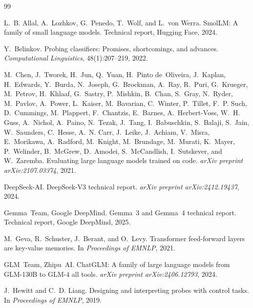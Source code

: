 \documentclass[11pt,a4paper]{article}
\begin{document}
\begin{thebibliography}{99}

L.~B. Allal, A.~Lozhkov, G.~Penedo, T.~Wolf, and L.~von Werra.
\newblock SmolLM: A family of small language models.
\newblock Technical report, Hugging Face, 2024.

Y.~Belinkov.
\newblock Probing classifiers: Promises, shortcomings, and advances.
\newblock \emph{Computational Linguistics}, 48(1):207--219, 2022.

M.~Chen, J.~Tworek, H.~Jun, Q.~Yuan, H.~Pinto de~Oliveira, J.~Kaplan, H.~Edwards, Y.~Burda, N.~Joseph, G.~Brockman, A.~Ray, R.~Puri, G.~Krueger, M.~Petrov, H.~Khlaaf, G.~Sastry, P.~Mishkin, B.~Chan, S.~Gray, N.~Ryder, M.~Pavlov, A.~Power, L.~Kaiser, M.~Bavarian, C.~Winter, P.~Tillet, F.~P. Such, D.~Cummings, M.~Plappert, F.~Chantzis, E.~Barnes, A.~Herbert-Voss, W.~H. Guss, A.~Nichol, A.~Paino, N.~Tezak, J.~Tang, I.~Babuschkin, S.~Balaji, S.~Jain, W.~Saunders, C.~Hesse, A.~N. Carr, J.~Leike, J.~Achiam, V.~Misra, E.~Morikawa, A.~Radford, M.~Knight, M.~Brundage, M.~Murati, K.~Mayer, P.~Welinder, B.~McGrew, D.~Amodei, S.~McCandlish, I.~Sutskever, and W.~Zaremba.
\newblock Evaluating large language models trained on code.
\newblock \emph{arXiv preprint arXiv:2107.03374}, 2021.

DeepSeek-AI.
\newblock DeepSeek-V3 technical report.
\newblock \emph{arXiv preprint arXiv:2412.19437}, 2024.

Gemma~Team, Google DeepMind.
\newblock Gemma~3 and Gemma~4 technical report.
\newblock Technical report, Google DeepMind, 2025.

M.~Geva, R.~Schuster, J.~Berant, and O.~Levy.
\newblock Transformer feed-forward layers are key-value memories.
\newblock In \emph{Proceedings of EMNLP}, 2021.

GLM~Team, Zhipu~AI.
\newblock ChatGLM: A family of large language models from GLM-130B to GLM-4 all tools.
\newblock \emph{arXiv preprint arXiv:2406.12793}, 2024.

J.~Hewitt and C.~D. Liang.
\newblock Designing and interpreting probes with control tasks.
\newblock In \emph{Proceedings of EMNLP}, 2019.


\end{thebibliography}
\end{document}
